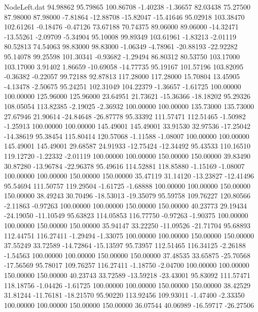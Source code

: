 \begin{filecontents}{NodeLeft.dat}
  94.98862   95.79865  100.86708    -1.40238   -1.36657   82.03438   75.27500   87.98000   87.98000   -7.81864  -12.88708  -15.82047  -15.41646
  95.02918  103.38470  102.61261    -0.18476   -0.47126   73.67188   70.74375   89.06000   89.06000  -14.32471  -13.55261   -2.09709   -5.34904
  95.10008   99.89349  103.61961    -1.83213   -2.01119   80.52813   74.54063   98.83000   98.83000   -1.06349   -4.78961  -20.88193  -22.92282
  95.14078   99.25598  101.30341    -0.93682   -1.29494   86.80312   80.53750  103.17000  103.17000    3.91402    1.86659  -10.69058  -14.77735
  95.19167  101.57196  103.82095    -0.36382   -0.22057   99.72188   92.87813  117.28000  117.28000   15.70804   13.45905   -4.13478   -2.50675
  95.24251  102.31049  104.22379    -1.36657   -1.61725  100.00000  100.00000  125.96000  125.96000   23.64951   21.73621  -15.36366  -18.18202
  95.29326  108.05054  113.82385    -2.19025   -2.36932  100.00000  100.00000  135.73000  135.73000   27.67946   21.90614  -24.84648  -26.87778
  95.33392  111.57471  112.51465    -1.50982   -1.25913  100.00000  100.00000  145.49001  145.49001   33.91530   32.97536  -17.25042  -14.38619
  95.38454  115.80414  120.57068    -1.11588   -1.08007  100.00000  100.00000  145.49001  145.49001   29.68587   24.91933  -12.75424  -12.34492
  95.43533  110.16510  119.12720    -1.22332   -2.01119  100.00000  100.00000  150.00000  150.00000   39.83490   30.87280  -13.96784  -22.96378
  95.49616  114.52881  118.85880    -1.15169   -1.08007  100.00000  100.00000  150.00000  150.00000   35.47119   31.14120  -13.23827  -12.41496
  95.54694  111.50757  119.29504    -1.61725   -1.68888  100.00000  100.00000  150.00000  150.00000   38.49243   30.70496  -18.53013  -19.35079
  95.59758  109.76227  120.80566    -2.11863   -0.97263  100.00000  100.00000  150.00000  150.00000   40.23773   29.19434  -24.19050  -11.10549
  95.63823  114.05853  116.77750    -0.97263   -1.90375  100.00000  100.00000  150.00000  150.00000   35.94147   33.22250  -11.09526  -21.71704
  95.68893  112.44751  116.27411    -1.29494   -1.33075  100.00000  100.00000  150.00000  150.00000   37.55249   33.72589  -14.72864  -15.13597
  95.73957  112.51465  116.34125    -2.26188   -1.54563  100.00000  100.00000  150.00000  150.00000   37.48535   33.65875  -25.70568  -17.56569
  95.78017  109.76257  116.27411    -1.18750   -2.04700  100.00000  100.00000  150.00000  150.00000   40.23743   33.72589  -13.59218  -23.43001
  95.83092  111.57471  118.18756    -1.04426   -1.61725  100.00000  100.00000  150.00000  150.00000   38.42529   31.81244  -11.76181  -18.21570
  95.90220  113.92456  109.93011    -1.47400   -2.33350  100.00000  100.00000  150.00000  150.00000   36.07544   40.06989  -16.59717  -26.27506

\end{filecontents}
